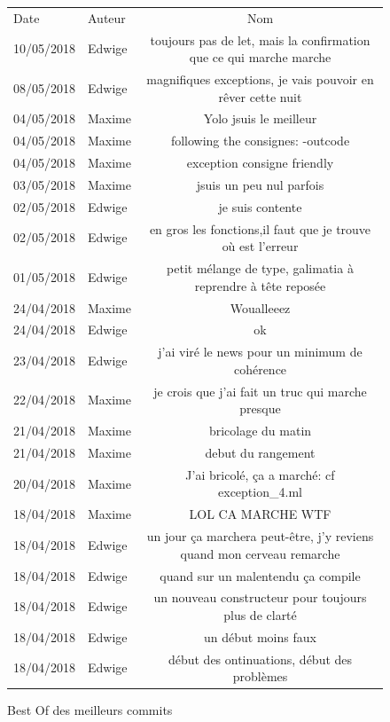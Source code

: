 \documentclass{article}
\begin{document}
		\begin{figure}[h]
			\centering		
		\begin{tabular}{l|l|c}
			Date & Auteur & Nom\\
			
			10/05/2018 & Edwige & toujours pas de let, mais la confirmation que ce qui marche marche \\
			08/05/2018 & Edwige & magnifiques exceptions, je vais pouvoir en rêver cette nuit \\
			04/05/2018 & Maxime & Yolo jsuis le meilleur \\
			04/05/2018 & Maxime & following the consignes: -outcode \\
			04/05/2018 & Maxime & exception consigne friendly \\
			03/05/2018 & Maxime & jsuis un peu nul parfois \\
			02/05/2018 & Edwige & je suis contente \\
			02/05/2018 & Edwige & en gros les fonctions,il faut que je trouve où est l'erreur \\
			01/05/2018 & Edwige & petit mélange de type, galimatia à reprendre à tête reposée \\
			24/04/2018 & Maxime & Woualleeez \\
			24/04/2018 & Edwige & ok \\
			23/04/2018 & Edwige & j'ai viré le news pour un minimum de cohérence \\
			22/04/2018 & Maxime & je crois que j'ai fait un truc qui marche presque \\
			21/04/2018 & Maxime & bricolage du matin \\
			21/04/2018 & Maxime & debut du rangement \\
			20/04/2018 & Maxime & J'ai bricolé, ça a marché: cf exception\_4.ml \\
			18/04/2018 & Maxime & LOL CA MARCHE WTF \\
			18/04/2018 & Edwige & un jour ça marchera peut-être, j'y reviens quand mon cerveau remarche \\
			18/04/2018 & Edwige & quand sur un malentendu ça compile \\
			18/04/2018 & Edwige & un nouveau constructeur pour toujours plus de clarté \\
			18/04/2018 & Edwige & un début moins faux \\
			18/04/2018 & Edwige & début des ontinuations, début des problèmes \\			
		\end{tabular}
	\caption{Best Of des meilleurs commits}
\end{figure}
\end{document}
